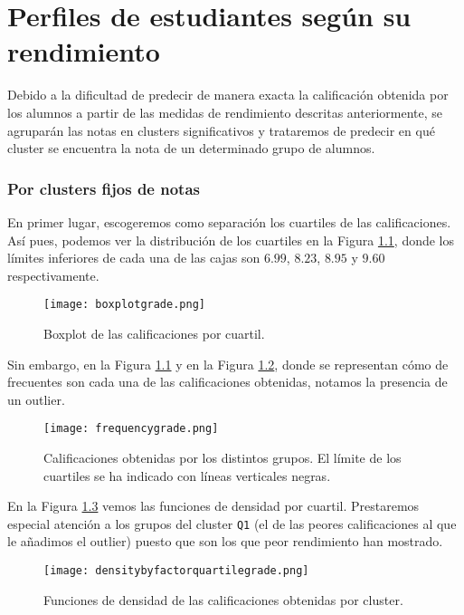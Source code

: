 \chapter{Perfiles de estudiantes según su rendimiento}

Debido a la dificultad de predecir de manera exacta la calificación obtenida por los alumnos a partir de las medidas de rendimiento descritas anteriormente, se agruparán las notas en clusters significativos y trataremos de predecir en qué cluster se encuentra la nota de un determinado grupo de alumnos.

\subsection{Por clusters fijos de notas}

En primer lugar, escogeremos como separación los cuartiles de las calificaciones. Así pues, podemos ver la distribución de los cuartiles en la Figura \ref{fig:boxplotgradequartilegrade}, donde los límites inferiores de cada una de las cajas son $6.99$, $8.23$, $8.95$ y $9.60$ respectivamente.

\begin{figure}[H]
    \centering
    \texttt{[image: boxplotgrade.png]}
    \caption{Boxplot de las calificaciones por cuartil.}
    \label{fig:boxplotgradequartilegrade}
\end{figure}

Sin embargo, en la Figura \ref{fig:boxplotgradequartilegrade} y en la Figura \ref{fig:frequenciesgrade}, donde se representan cómo de frecuentes son cada una de las calificaciones obtenidas, notamos la presencia de un outlier.

\begin{figure}[H]
    \centering
    \texttt{[image: frequencygrade.png]}
    \caption{Calificaciones obtenidas por los distintos grupos. El límite de los cuartiles se ha indicado con líneas verticales negras.}
    \label{fig:frequenciesgrade}
\end{figure}

En la Figura \ref{fig:densitybyfactorquartilegrade} vemos las funciones de densidad por cuartil. Prestaremos especial atención a los grupos del cluster \texttt{Q1} (el de las peores calificaciones al que le añadimos el outlier) puesto que son los que peor rendimiento han mostrado.

\begin{figure}[H]
    \centering
    \texttt{[image: densitybyfactorquartilegrade.png]}
    \caption{Funciones de densidad de las calificaciones obtenidas por cluster.}
    \label{fig:densitybyfactorquartilegrade}
\end{figure}
